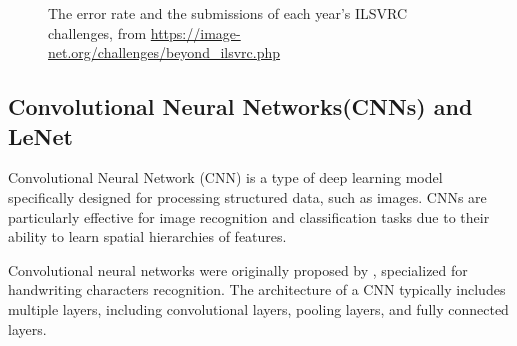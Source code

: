 \documentclass[a4paper]{article}
\begin{document}
\begin{figure}[ht]
\begin{minipage}{0.35\textwidth}
    \end{minipage}
    \caption{The error rate and the submissions of each year's ILSVRC challenges, from \url{https://image-net.org/challenges/beyond_ilsvrc.php}}
\end{figure}



\subsection{Convolutional Neural Networks(CNNs) and LeNet}
Convolutional Neural Network (CNN) is a type of deep learning model specifically designed for processing structured data, such as images. CNNs are particularly effective for image recognition and classification tasks due to their ability to learn spatial hierarchies of features. 

Convolutional neural networks were originally proposed by \citet{726791}, specialized for handwriting characters recognition. The architecture of a CNN typically includes multiple layers, including convolutional layers, pooling layers, and fully connected layers.
\end{document}
